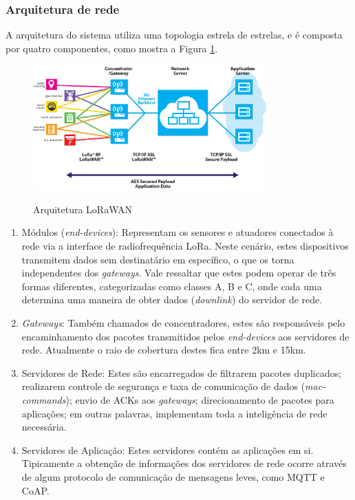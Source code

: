 \documentclass[oneside,openright,12pt]{ufsm_2015} %
\begin{document}
\subsubsection{Arquitetura de rede}
\par
A arquitetura do sistema utiliza uma topologia estrela de estrelas, e é composta por quatro componentes, como mostra a Figura \ref{fig:lora-arch}.
\begin{figure}[H]
    \caption{\label{exepretex} Arquitetura LoRaWAN}
    \centering
    \includegraphics[width=0.8\textwidth]{figuras/what-network_diagram.png}
    \vspace{\baselineskip} %
        \label{fig:lora-arch}
\end{figure}

\begin{enumerate}
    \item Módulos (\textit{end-devices}): Representam os sensores e atuadores conectados à rede via a interface de radiofrequência LoRa. Neste cenário, estes dispositivos transmitem dados sem destinatário em específico, o que os torna independentes dos \textit{gateways}. Vale ressaltar que estes podem operar de três formas diferentes, categorizadas como classes A, B e C, onde cada uma determina uma maneira de obter dados (\textit{downlink}) do servidor de rede.
    \item \textit{Gateways}: Também chamados de concentradores, estes são responsáveis pelo encaminhamento dos pacotes transmitidos pelos \textit{end-devices} aos servidores de rede. Atualmente o raio de cobertura destes fica entre 2km e 15km.
    \item Servidores de Rede: Estes são encarregados de filtrarem pacotes duplicados; realizarem controle de segurança e taxa de comunicação de dados (\textit{mac-commands}); envio de ACKs aos \textit{gateways}; direcionamento de pacotes para aplicações; em outras palavras, implementam toda a inteligência de rede necessária.
    \item Servidores de Aplicação: Estes servidores contém as aplicações em si. Tipicamente a obtenção de informações dos servidores de rede ocorre através de algum protocolo de comunicação de mensagens leves, como MQTT e CoAP.
\end{enumerate}
\end{document}
